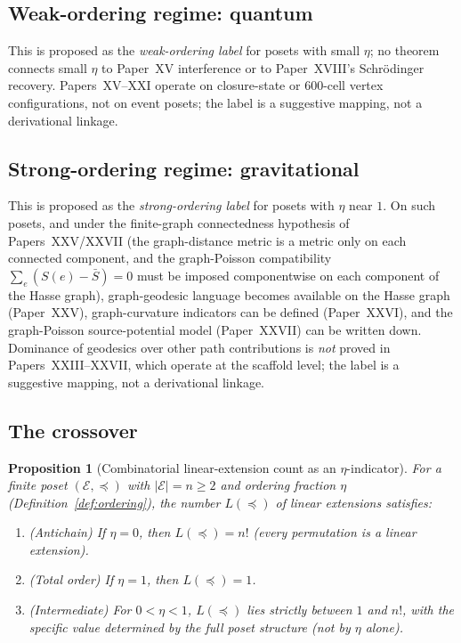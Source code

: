 \documentclass[12pt]{article}
\newtheorem{proposition}[theorem]{Proposition}
\newcommand{\Ecal}{\mathcal{E}}
\begin{document}
\subsection{Weak-ordering regime: quantum}

This is proposed as the \emph{weak-ordering label} for posets with small $\eta$; no theorem connects small $\eta$ to Paper~XV interference or to Paper~XVIII's Schr\"odinger recovery. Papers~XV--XXI operate on closure-state or 600-cell vertex configurations, not on event posets; the label is a suggestive mapping, not a derivational linkage.

\subsection{Strong-ordering regime: gravitational}

This is proposed as the \emph{strong-ordering label} for posets with $\eta$ near $1$. On such posets, and under the finite-graph connectedness hypothesis of Papers~XXV/XXVII (the graph-distance metric is a metric only on each connected component, and the graph-Poisson compatibility $\sum_e (S(e) - \bar S) = 0$ must be imposed componentwise on each component of the Hasse graph), graph-geodesic language becomes available on the Hasse graph (Paper~XXV), graph-curvature indicators can be defined (Paper~XXVI), and the graph-Poisson source-potential model (Paper~XXVII) can be written down. Dominance of geodesics over other path contributions is \emph{not} proved in Papers~XXIII--XXVII, which operate at the scaffold level; the label is a suggestive mapping, not a derivational linkage.

\subsection{The crossover}

\begin{proposition}[Combinatorial linear-extension count as an $\eta$-indicator]\label{prop:regime}
For a finite poset $(\Ecal, \preceq)$ with $|\Ecal| = n \ge 2$ and ordering fraction $\eta$ (Definition~\ref{def:ordering}), the number $L(\preceq)$ of linear extensions satisfies:
\begin{enumerate}
    \item \textup{(Antichain)} If $\eta = 0$, then $L(\preceq) = n!$ (every permutation is a linear extension).
    \item \textup{(Total order)} If $\eta = 1$, then $L(\preceq) = 1$.
    \item \textup{(Intermediate)} For $0 < \eta < 1$, $L(\preceq)$ lies strictly between $1$ and $n!$, with the specific value determined by the full poset structure (not by $\eta$ alone).
\end{enumerate}
\end{proposition}
\end{document}
